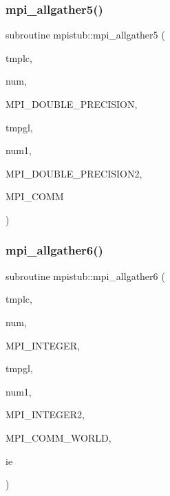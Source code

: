 \subsubsection{\texorpdfstring{mpi\_allgather5()}{mpi\_allgather5()}}
{\footnotesize\ttfamily subroutine mpistub\+::mpi\+\_\+allgather5 (\begin{DoxyParamCaption}\item[{double precision, dimension(\+:,\+:)}]{tmplc,  }\item[{}]{num,  }\item[{}]{M\+P\+I\+\_\+\+D\+O\+U\+B\+L\+E\+\_\+\+P\+R\+E\+C\+I\+S\+I\+ON,  }\item[{double precision, dimension(\+:,\+:)}]{tmpgl,  }\item[{}]{num1,  }\item[{}]{M\+P\+I\+\_\+\+D\+O\+U\+B\+L\+E\+\_\+\+P\+R\+E\+C\+I\+S\+I\+O\+N2,  }\item[{}]{M\+P\+I\+\_\+\+C\+O\+MM }\end{DoxyParamCaption})}

\mbox{\label{namespacempistub_ace33f6f5c0cff4120ef8d624a20adf59}} 
\subsubsection{\texorpdfstring{mpi\_allgather6()}{mpi\_allgather6()}}
{\footnotesize\ttfamily subroutine mpistub\+::mpi\+\_\+allgather6 (\begin{DoxyParamCaption}\item[{integer, dimension(\+:,\+:)}]{tmplc,  }\item[{}]{num,  }\item[{}]{M\+P\+I\+\_\+\+I\+N\+T\+E\+G\+ER,  }\item[{integer, dimension(\+:,\+:)}]{tmpgl,  }\item[{}]{num1,  }\item[{}]{M\+P\+I\+\_\+\+I\+N\+T\+E\+G\+E\+R2,  }\item[{}]{M\+P\+I\+\_\+\+C\+O\+M\+M\+\_\+\+W\+O\+R\+LD,  }\item[{}]{ie }\end{DoxyParamCaption})}

\mbox{\label{namespacempistub_a35fa927935bbf54e76460692ed2ae189}} 
